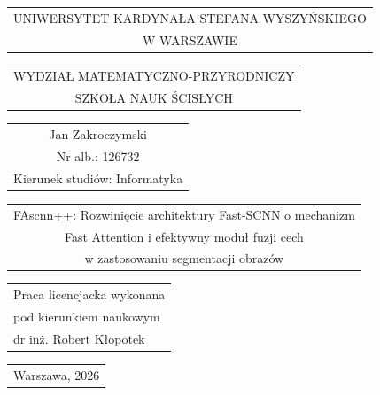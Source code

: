 \documentclass[final,a4paper,openany,12pt]{mwbk}
\newcommand{\uczelnia}{UNIWERSYTET KARDYNAŁA STEFANA WYSZYŃSKIEGO\\W WARSZAWIE}
\newcommand{\wydzial}{WYDZIAŁ MATEMATYCZNO-PRZYRODNICZY\\SZKOŁA NAUK ŚCISŁYCH}
\newcommand{\kierunek}{Informatyka}
\newcommand{\miasto}{Warszawa}
\newcommand{\rok}{2026}
\newcommand{\autor}{Jan Zakroczymski}
\newcommand{\nrindeksu}{126732}
\newcommand{\promotor}{dr inż. Robert Kłopotek}
\newcommand{\tytul}{FAscnn++: Rozwinięcie architektury Fast-SCNN o mechanizm\\Fast Attention i efektywny moduł fuzji cech\\w zastosowaniu segmentacji obrazów}
\begin{document}
\begin{titlepage}
\vspace{-0.5cm}

{\centering
{\footnotesize
\begin{tabular}{c}
\uczelnia\\
\end{tabular}
}
\vspace{2.5cm}

{\footnotesize
\begin{tabular}{c}
\wydzial\\
\end{tabular}
}
\vspace{3.5cm}

\renewcommand{\arraystretch}{1.5} %

{\normalsize
\begin{tabular}{c}
\autor\\
Nr alb.: \nrindeksu\\
Kierunek studiów: \kierunek\\
\end{tabular}
}

\vspace{1.5cm}

{\large
\begin{tabular}{c}
\tytul\\
\end{tabular}
}

}

\renewcommand{\arraystretch}{1} %

\vspace{5cm}

\hspace{6cm}
\begin{tabular}{l}
Praca licencjacka wykonana\\
pod kierunkiem naukowym\\
\promotor
\end{tabular}

\vspace{3cm}

{\centering

{\small
\begin{tabular}{c}
{\miasto, \rok}\\
\end{tabular}
}

}
\end{titlepage}

\tableofcontents
\end{document}

